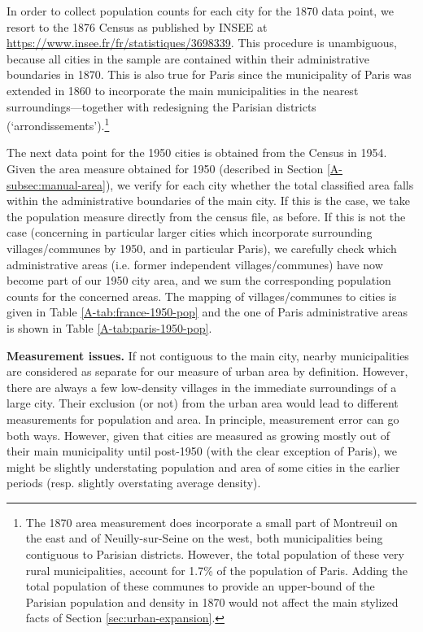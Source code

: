 \documentclass[11pt]{report}
\newcommand{\datatables}{../../output/data/tables}
\begin{document}
In order to collect population counts for each city for the 1870 data point, we resort to the 1876 Census as published by INSEE at \url{https://www.insee.fr/fr/statistiques/3698339}. This procedure is unambiguous, because all cities in the sample are contained within their administrative boundaries in 1870. This is also true for Paris since the municipality of Paris was extended in 1860 to incorporate the main municipalities in the nearest surroundings---together with redesigning the Parisian districts (`arrondissements').\footnote{The 1870 area measurement does incorporate a small part of Montreuil on the east and of Neuilly-sur-Seine on the west, both municipalities being contiguous to Parisian districts. However, the total population of these very rural municipalities, account for 1.7\% of the population of Paris. Adding the total population of these communes to provide an upper-bound of the Parisian population and density in 1870 would not affect the main stylized facts of Section \ref{sec:urban-expansion}.}

The next data point for the 1950 cities is obtained from the Census in 1954. Given the area measure obtained for 1950 (described in Section \ref{A-subsec:manual-area}), we verify for each city whether the total classified area falls within the administrative boundaries of the main city. If this is the case, we take the population measure directly from the census file, as before. If this is not the case (concerning in particular larger cities which incorporate surrounding villages/communes by 1950, and in particular Paris), we carefully check which administrative areas (i.e. former independent villages/communes) have now become part of our 1950 city area, and we sum the corresponding population counts for the concerned areas. The mapping of villages/communes to cities is given in Table \ref{A-tab:france-1950-pop} and the one of Paris administrative areas is shown in Table \ref{A-tab:paris-1950-pop}. 




\pagebreak




\textbf{Measurement issues.} If not contiguous to the main city, nearby municipalities are considered as separate for our measure of urban area by definition. However, there are always a few low-density villages in the immediate surroundings of a large city. Their exclusion (or not) from the urban area would lead to different measurements for population and area. In principle, measurement error can go both ways. However, given that cities are measured as growing mostly out of their main municipality until post-1950 (with the clear exception of Paris), we might be slightly understating population and area of some cities in the earlier periods (resp. slightly overstating average density).
\end{document}
